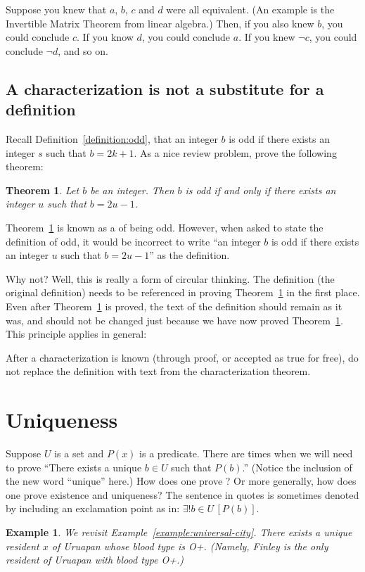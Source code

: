 \documentclass{book}
\newcounter{ekcounter}%
\theoremstyle{ekimcustom}
\newtheorem{theorem}[ekcounter]{Theorem}
\newtheorem{example}[ekcounter]{Example}
\newcommand\defn[1]{{\color{blue}{\bf #1}}}
\begin{document}
Suppose you knew that $a$, $b$, $c$ and $d$ were all equivalent. (An example is the Invertible Matrix Theorem from linear algebra.) Then, if you also knew $b$, you could conclude $c$. If you know $d$, you could conclude $a$. If you knew $\neg c$, you could conclude $\neg d$, and so on.

\subsection{A characterization is not a substitute for a definition}

Recall Definition~\ref{definition:odd}, that an integer $b$ is odd if there exists an integer $s$ such that $b=2k+1$. As a nice review problem, prove the following theorem:
\begin{theorem}\label{theorem:odd-characterization}
Let $b$ be an integer. Then $b$ is odd if and only if there exists an integer $u$ such that $b=2u-1$.
\end{theorem}
Theorem~\ref{theorem:odd-characterization} is known as a \defn{characterization} of being odd. However, when asked to state the definition of odd, it would be incorrect to write ``an integer $b$ is odd if there exists an integer $u$ such that $b=2u-1$'' as the definition.

Why not? Well, this is really a form of circular thinking. The definition (the original definition) needs to be referenced in proving Theorem~\ref{theorem:odd-characterization} in the first place. Even after Theorem~\ref{theorem:odd-characterization} is proved, the text of the definition should remain as it was, and should not be changed just because we have now proved Theorem~\ref{theorem:odd-characterization}. This principle applies in general:
\begin{bwarning}{}{}
After a characterization is known (through proof, or accepted as true for free), do not replace the definition with text from the characterization theorem.
\end{bwarning}

\section{Uniqueness}\label{section:uniqueness}

Suppose $U$ is a set and $P(x)$ is a predicate. There are times when we will need to prove ``There exists a unique $b \in U$ such that $P(b)$.'' (Notice the inclusion of the new word ``unique'' here.) How does one prove \defn{uniqueness}? Or more generally, how does one prove existence and uniqueness? The sentence in quotes is sometimes denoted by including an exclamation point as in: $\exists ! b \in U\,[P(b)]$.
\begin{example}
We revisit Example~\ref{example:universal-city}. There exists a unique resident $x$ of Uruapan whose blood type is O+. (Namely, Finley is the only resident of Uruapan with blood type O+.)
\end{example}
\end{document}
